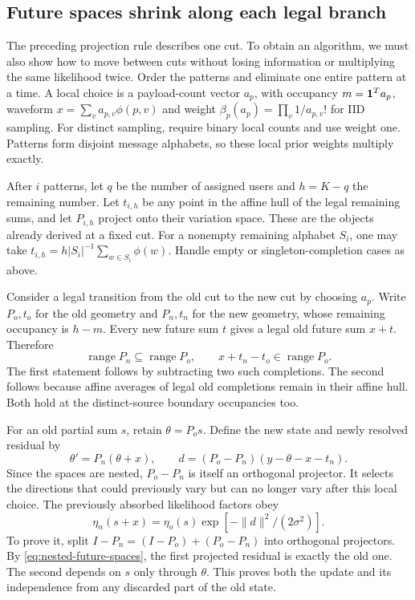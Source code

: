 \documentclass[10pt,a4paper]{article}
\begin{document}
\subsection{Future spaces shrink along each legal branch}
The preceding projection rule describes one cut. To obtain an algorithm, we must also show how to move between
cuts without losing information or multiplying the same likelihood twice.
Order the patterns and eliminate one entire pattern at a time. A local choice is a payload-count vector $a_p$,
with occupancy $m=\mathbf{1}^Ta_p$, waveform $x=\sum_v a_{p,v}\phi(p,v)$ and weight
$\beta_p(a_p)=\prod_v1/a_{p,v}!$ for IID sampling. For distinct sampling, require binary local counts and use
weight one. Patterns form disjoint message alphabets, so these local prior weights multiply exactly.

After $i$ patterns, let $q$ be the number of assigned users and $h=K-q$ the remaining number.
Let $t_{i,h}$ be any point in the affine hull of the legal remaining sums, and let $P_{i,h}$ project onto their
variation space. These are the objects already derived at a fixed cut. For a nonempty remaining alphabet $S_i$,
one may take $t_{i,h}=h|S_i|^{-1}\sum_{w\in S_i}\phi(w)$. Handle empty or singleton-completion cases as above.

Consider a legal transition from the old cut to the new cut by choosing $a_p$. Write $P_o,t_o$ for the old
geometry and $P_n,t_n$ for the new geometry, whose remaining occupancy is $h-m$.
Every new future sum $t$ gives a legal old future sum $x+t$. Therefore
\begin{equation}
 \operatorname{range}P_n\subseteq\operatorname{range}P_o,\qquad
 x+t_n-t_o\in\operatorname{range}P_o.
 \label{eq:nested-future-spaces}
\end{equation}
The first statement follows by subtracting two such completions. The second follows because affine averages
of legal old completions remain in their affine hull. Both hold at the distinct-source boundary occupancies too.

For an old partial sum $s$, retain $\theta=P_os$. Define the new state and newly resolved residual by
\begin{equation}
 \theta'=P_n(\theta+x),\qquad
 d=(P_o-P_n)(y-\theta-x-t_n).
 \label{eq:nested-transition}
\end{equation}
Since the spaces are nested, $P_o-P_n$ is itself an orthogonal projector. It selects the directions that could
previously vary but can no longer vary after this local choice.
The previously absorbed likelihood factors obey
\begin{equation}
 \boxed{\eta_n(s+x)=\eta_o(s)\exp[-\|d\|^2/(2\sigma^2)].}
 \label{eq:likelihood-telescope}
\end{equation}
To prove it, split $I-P_n=(I-P_o)+(P_o-P_n)$ into orthogonal projectors.
By \eqref{eq:nested-future-spaces}, the first projected residual is exactly the old one.
The second depends on $s$ only through $\theta$. This proves both the update and its independence from any
discarded part of the old state.
\end{document}
